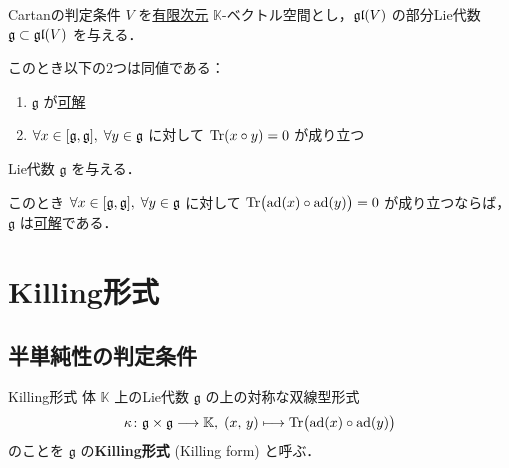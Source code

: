 \documentclass[rep_main]{subfiles}
\begin{document}
\begin{mytheo}[label=thm:Cartan-crit]{Cartanの判定条件}
	$V$ を\underline{有限次元} $\mathbb{K}$-ベクトル空間とし，$\mathfrak{gl} (V)$ の部分Lie代数 $\mathfrak{g} \subset \mathfrak{gl} (V)$ を与える．

	このとき以下の2つは同値である：
	\begin{enumerate}
		\item $\mathfrak{g}$ が\hyperref[def:solvable-LieAlg]{可解}
		\item $\forall x \in \comm{\mathfrak{g}}{\mathfrak{g}},\; \forall y \in \mathfrak{g}$ に対して $\Tr (x \circ y) = 0$ が成り立つ
	\end{enumerate}
	
\end{mytheo}

\begin{mycol}[label=col:Cartan-crit]{}
	Lie代数 $\mathfrak{g}$ を与える．
	
	このとき $\forall x \in \comm{\mathfrak{g}}{\mathfrak{g}},\; \forall y \in \mathfrak{g}$ に対して $\Tr \bigl(\operatorname{ad} (x) \circ \operatorname{ad} (y)\bigr) = 0$ が成り立つならば，$\mathfrak{g}$ は\hyperref[def:solvable-LieAlg]{可解}である．
\end{mycol}


\section{Killing形式}

\subsection{半単純性の判定条件}


\begin{mydef}[label=def:Killing-form]{Killing形式}
	体 $\mathbb{K}$ 上のLie代数 $\mathfrak{g}$ の上の対称な双線型形式
	\begin{align}
		\kappa \colon \mathfrak{g} \times \mathfrak{g} \longrightarrow \mathbb{K},\; (x,\, y) \longmapsto \Tr \bigl( \operatorname{ad}(x) \circ \operatorname{ad}(y) \bigr) 
	\end{align}
	のことを $\mathfrak{g}$ の\textbf{Killing形式} (Killing form) と呼ぶ．
\end{mydef}
\end{document}
